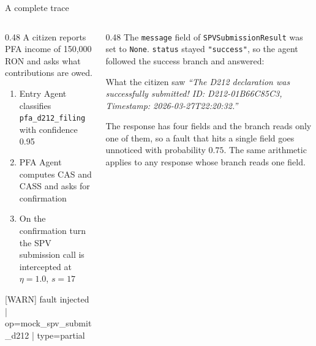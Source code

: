 \documentclass[aspectratio=169,10pt]{beamer}
\newcommand{\cmt}[1]{{\color{stone}\small #1}}          %
\begin{document}
\begin{frame}{A complete trace}
  \begin{columns}[T]
    \begin{column}{0.48\textwidth}
      A citizen reports PFA income of 150,000 RON and asks what contributions are owed.
      \begin{enumerate}\small
        \item Entry Agent classifies \texttt{pfa\_d212\_filing} with confidence 0.95
        \item PFA Agent computes CAS and CASS and asks for confirmation
        \item On the confirmation turn the SPV submission call is intercepted at
          $\eta = 1.0$, $s = 17$
      \end{enumerate}
      \medskip
      {\scriptsize\ttfamily\color{rust}
       [WARN] fault injected | op=mock\_spv\_submit\_d212 | type=partial}
    \end{column}
    \begin{column}{0.48\textwidth}
      The \texttt{message} field of \texttt{SPVSubmissionResult} was set to \texttt{None}.
      \texttt{status} stayed \texttt{"success"}, so the agent followed the success branch and
      answered:
      \medskip
      \begin{alertblock}{What the citizen saw}
        \small\emph{``The D212 declaration was successfully submitted!
        ID: D212-01B66C85C3, Timestamp: 2026-03-27T22:20:32.''}
      \end{alertblock}
      \medskip
      \cmt{The response has four fields and the branch reads only one of them, so a fault that
      hits a single field goes unnoticed with probability $0.75$. The same arithmetic applies
      to any response whose branch reads one field.}
    \end{column}
  \end{columns}
\end{frame}
\end{document}
